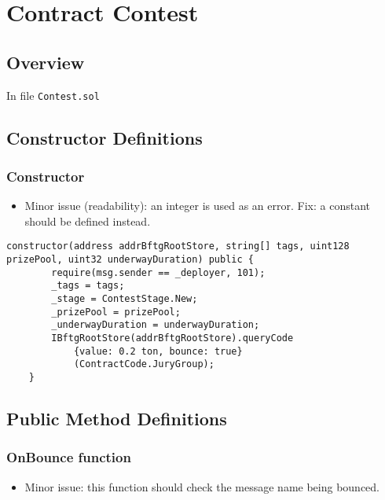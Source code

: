 
\chapter{Contract Contest}

\minitoc

\section{Overview}


In file {\tt Contest.sol}

\section{Constructor Definitions}

\subsection{Constructor}

\begin{itemize}
\item Minor issue (readability): an integer is used as an error. Fix:
  a constant should be defined instead.
\end{itemize}

\begin{lstlisting}[firstnumber=34]
    constructor(address addrBftgRootStore, string[] tags, uint128 prizePool, uint32 underwayDuration) public {
        require(msg.sender == _deployer, 101);
        _tags = tags;
        _stage = ContestStage.New;
        _prizePool = prizePool;
        _underwayDuration = underwayDuration;
        IBftgRootStore(addrBftgRootStore).queryCode
            {value: 0.2 ton, bounce: true}
            (ContractCode.JuryGroup);
    }
\end{lstlisting}

\section{Public Method Definitions}


\subsection{OnBounce function}

\begin{itemize}
\item Minor issue: this function should check the message name being
  bounced.
\end{itemize}

